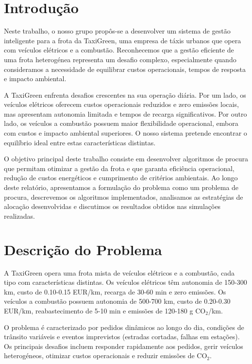 \documentclass[11pt,a4paper]{article}
\begin{document}
\newpage

\tableofcontents
\newpage

\section{Introdução}

Neste trabalho, o nosso grupo propôs-se a desenvolver um sistema de gestão inteligente para a frota da TaxiGreen, uma empresa de táxis urbanos que opera com veículos elétricos e a combustão. Reconhecemos que a gestão eficiente de uma frota heterogénea representa um desafio complexo, especialmente quando consideramos a necessidade de equilibrar custos operacionais, tempos de resposta e impacto ambiental.

A TaxiGreen enfrenta desafios crescentes na sua operação diária. Por um lado, os veículos elétricos oferecem custos operacionais reduzidos e zero emissões locais, mas apresentam autonomia limitada e tempos de recarga significativos. Por outro lado, os veículos a combustão possuem maior flexibilidade operacional, embora com custos e impacto ambiental superiores. O nosso sistema pretende encontrar o equilíbrio ideal entre estas características distintas.

O objetivo principal deste trabalho consiste em desenvolver algoritmos de procura que permitam otimizar a gestão da frota e que garanta eficiência operacional, redução de custos energéticos e cumprimento de critérios ambientais. Ao longo deste relatório, apresentamos a formulação do problema como um problema de procura, descrevemos os algoritmos implementados, analisamos as estratégias de alocação desenvolvidas e discutimos os resultados obtidos nas simulações realizadas.

\section{Descrição do Problema}

A TaxiGreen opera uma frota mista de veículos elétricos e a combustão, cada tipo com características distintas. Os veículos elétricos têm autonomia de 150-300 km, custo de 0.10-0.15 EUR/km, recarga de 30-60 min e zero emissões. Os veículos a combustão possuem autonomia de 500-700 km, custo de 0.20-0.30 EUR/km, reabastecimento de 5-10 min e emissões de 120-180 g CO$_2$/km.

O problema é caracterizado por pedidos dinâmicos ao longo do dia, condições de trânsito variáveis e eventos imprevistos (estradas cortadas, falhas em estações). Os principais desafios incluem responder rapidamente aos pedidos, gerir veículos heterogéneos, otimizar custos operacionais e reduzir emissões de CO$_2$.
\end{document}
